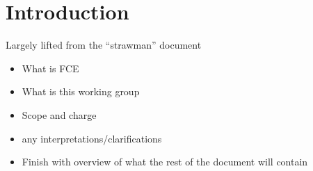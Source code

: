 \section{Introduction}

Largely lifted from the ``strawman'' document
\begin{itemize}
\item What is FCE
\item What is this working group
\item Scope and charge
\item any interpretations/clarifications
\item Finish with overview of what the rest of the document will contain
\end{itemize}

